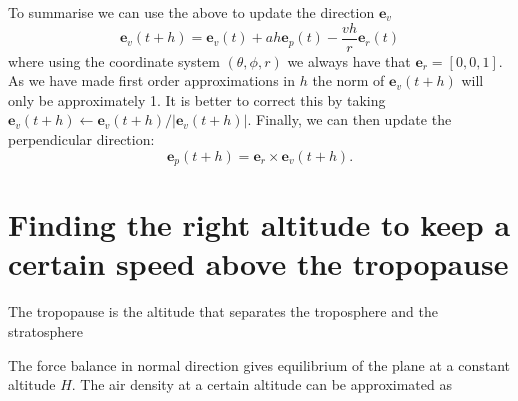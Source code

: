 \documentclass{article}
\renewcommand{\vec}[1]{\boldsymbol{#1}}
\begin{document}
 
To summarise we can use the above to update the direction $\vec e_v$
\begin{equation}
    \vec e_v(t+h) = \vec e_v(t) + a h \vec e_p(t) - \frac{v h}{r} \vec e_r(t)
\end{equation}
where using the coordinate system $(\theta,\phi,r)$ we always have that $\vec e_r = [0,0,1]$. As we have made first order approximations in $h$ the norm of $\vec e_v(t+h)$ will only be approximately 1. It is better to correct this by taking $ \vec e_v(t+h)  \leftarrow  \vec e_v(t+h) / | \vec e_v(t+h) |$. Finally, we can then update the perpendicular direction:
\begin{equation}
    \vec e_p(t+h) = \vec e_r \times \vec e_v(t+h).
\end{equation}




\section{Finding the right altitude to keep a certain speed above the tropopause}

The tropopause is the altitude that separates the troposphere and the stratosphere 

The force balance in normal direction gives equilibrium of the plane at a constant altitude $H$. 
The air density at a certain altitude can be approximated as
\end{document}
